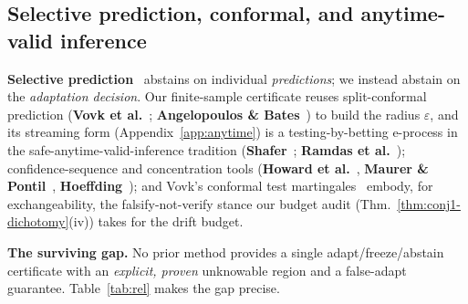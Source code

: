 \documentclass[conference]{IEEEtran}
\theoremstyle{plain}
\theoremstyle{definition}
\begin{document}
\subsection{Selective prediction, conformal, and anytime-valid inference}
\textbf{Selective prediction}~\cite{geifman2017selective} abstains on individual \emph{predictions};
we instead abstain on the \emph{adaptation decision}. Our finite-sample certificate reuses
split-conformal prediction (\textbf{Vovk et al.}~\cite{vovk2005}; \textbf{Angelopoulos \& Bates}~\cite{angelopoulos2023}) to build the
radius $\varepsilon$, and its streaming form (Appendix~\ref{app:anytime}) is a
testing-by-betting e-process in the safe-anytime-valid-inference tradition (\textbf{Shafer}~\cite{shafer2021};
\textbf{Ramdas et al.}~\cite{ramdas2023}); confidence-sequence and concentration tools
(\textbf{Howard et al.}~\cite{howard2021timeuniform}, \textbf{Maurer \& Pontil}~\cite{maurer2009empirical},
\textbf{Hoeffding}~\cite{hoeffding1963probability}); and Vovk's conformal test martingales~\cite{vovk2021martingale}
embody, for exchangeability, the falsify-not-verify stance our budget audit
(Thm.~\ref{thm:conj1-dichotomy}(iv)) takes for the drift budget.

\noindent\textbf{The surviving gap.} No prior method provides a single adapt/freeze/abstain
certificate with an \emph{explicit, proven} unknowable region and a false-adapt guarantee.
Table~\ref{tab:rel} makes the gap precise.

\begin{table}[t]\centering\small
{}
\caption{Positioning. Prior TTA adapts and (some) detect failure; none gives a
\emph{pre-adaptation} adapt/freeze/abstain certificate with a false-adapt bound.}
\label{tab:rel}
\end{table}
\end{document}
